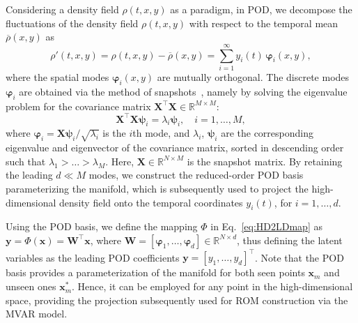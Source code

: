 \documentclass{article}
\begin{document}
Considering a density field $\rho(t,x,y)$ as a paradigm, in POD, we decompose the fluctuations of the density field $\rho(t,x,y)$ with respect to the temporal mean $\overline{\rho}(x,y)$ as
\begin{equation}
\label{eq:POD_def}
\rho'(t,x, y) = \rho(t,x, y) - \overline{\rho}(x, y) = \sum_{i=1}^{\infty} y_i(t)\, \boldsymbol{\varphi}_i(x, y),
\end{equation}
where the spatial modes $\boldsymbol{\varphi}_i(x,y)$ are mutually orthogonal. The discrete modes $\boldsymbol{\varphi}_i$ are obtained via the method of snapshots~\cite{Sirovich}, namely by solving the eigenvalue problem for the covariance matrix $\mathbf{X}^\top\mathbf{X} \in \mathbb{R}^{M \times M}$:
\begin{equation} 
\label{eq:eigprobQQt}
\mathbf{X}^\top\mathbf{X} \boldsymbol{\psi}_i = \lambda_i \boldsymbol{\psi}_i, \quad i=1, \ldots, M,
\end{equation}
where $\boldsymbol{\varphi}_i  = \mathbf{X} \boldsymbol{\psi}_i / \sqrt{\lambda_i}$ is the $i$th mode, and $\lambda_i$, $\boldsymbol{\psi}_i$ are the corresponding eigenvalue and eigenvector of the covariance matrix, sorted in descending order such that $\lambda_1 > \ldots > \lambda_M$. Here, $\mathbf{X} \in \mathbb{R}^{N \times M}$ is the snapshot matrix. By retaining the leading $d \ll M$ modes, we construct the reduced-order POD basis parameterizing the manifold, which is subsequently used to project the high-dimensional density field onto the temporal coordinates $y_i(t)$, for $i=1, \dots, d$.

Using the POD basis, we define the mapping $\varPhi$ in Eq.~\eqref{eq:HD2LDmap} as $\mathbf{y} = \varPhi(\mathbf{x}) = \mathbf{W}^\top\mathbf{x}$, where $\mathbf{W} = [\boldsymbol{\varphi}_1,\ldots,\boldsymbol{\varphi}_d] \in \mathbb{R}^{N\times d}$, thus defining the latent variables as the leading POD coefficients $\mathbf{y} = [y_1,\ldots,y_d]^\top$. Note that the POD basis provides a parameterization of the manifold for both seen points $\mathbf{x}_m$ and unseen ones $\mathbf{x}^*_m$. Hence, it can be employed for any point in the high-dimensional space, providing the projection subsequently used for ROM construction via the MVAR model.
\end{document}

